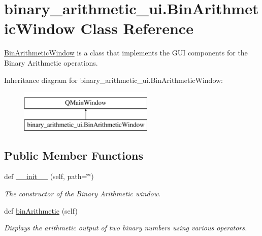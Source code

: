 \hypertarget{classbinary__arithmetic__ui_1_1_bin_arithmetic_window}{}\section{binary\+\_\+arithmetic\+\_\+ui.\+Bin\+Arithmetic\+Window Class Reference}
\label{classbinary__arithmetic__ui_1_1_bin_arithmetic_window}


\hyperlink{classbinary__arithmetic__ui_1_1_bin_arithmetic_window}{Bin\+Arithmetic\+Window} is a class that implements the G\+UI components for the Binary Arithmetic operations.  


Inheritance diagram for binary\+\_\+arithmetic\+\_\+ui.\+Bin\+Arithmetic\+Window\+:\begin{figure}[H]
\begin{center}
\leavevmode
\includegraphics[height=2.000000cm]{classbinary__arithmetic__ui_1_1_bin_arithmetic_window}
\end{center}
\end{figure}
\subsection*{Public Member Functions}
\begin{DoxyCompactItemize}
\item 
def \hyperlink{classbinary__arithmetic__ui_1_1_bin_arithmetic_window_a0511ad3ac87d51b48420f7dc4c4dd35d}{\+\_\+\+\_\+init\+\_\+\+\_\+} (self, path=\char`\"{}\char`\"{})
\begin{DoxyCompactList}\small\item\em The constructor of the Binary Arithmetic window. \end{DoxyCompactList}\item 
def \hyperlink{classbinary__arithmetic__ui_1_1_bin_arithmetic_window_ae3a5ab3baee92929acc1ee524456825a}{bin\+Arithmetic} (self)
\begin{DoxyCompactList}\small\item\em Displays the arithmetic output of two binary numbers using various operators. \end{DoxyCompactList}\end{DoxyCompactItemize}
